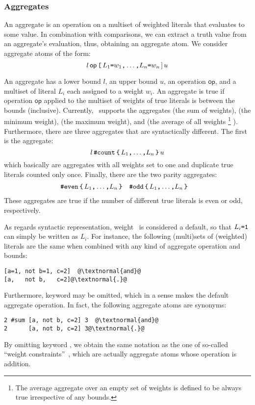 \subsubsection{Aggregates}\label{subsec:gringo:aggregate}

An aggregate is an operation on a multiset of weighted literals that evaluates to some value. 
In combination with comparisons, we can extract a truth value from an aggregate's evaluation,
thus, obtaining an aggregate atom.
We consider aggregate atoms of the form:
\[l\,\mathsf{op}\,\texttt{[}\, L_1\texttt{=}w_1\texttt{,} \dots\texttt{,} L_n\texttt{=}w_n {\,]\,} u\]

An aggregate has a lower bound $l$, an upper bound $u$, an operation $\mathsf{op}$, 
and a multiset of literal $L_i$ each assigned to a weight $w_i$.
An aggregate is true if operation $\mathsf{op}$ applied to the multiset of weights 
of true literals is between the bounds (inclusive).
Currently, \gringo\ supports the aggregates 
 (the sum of weights), 
 (the minimum weight), 
 (the maximum weight), and
 (the average of all weights
\footnote{The average aggregate over an empty set of weights is defined to be always true irrespective of any bounds.}%
).
Furthermore, there are three aggregates that are syntactically different.
The first is the  aggregate:
\[l\,\code{\#count}\,\code{\char`\{}\, L_1\code{,} \dots\code{,} L_n \,\code{\char`\}}\, u\]%
which basically are  aggregates with all weights set to one 
and duplicate true literals counted only once.
Finally, there are the two parity aggregates:
\begin{align*}
&\code{\#even}\,\code{\char`\{}\, L_1\code{,} \dots\code{,} L_n \,\code{\char`\}} & &
\code{\#odd}\,\code{\char`\{}\, L_1\code{,} \dots\code{,} L_n \,\code{\char`\}}
\end{align*}%
These aggregates are true if the number of different true literals is even or odd, respectively.

As regards syntactic representation,
weight~ is considered a default,
so that $L_i\texttt{=}\texttt{1}$ can simply be written as $L_i$.
For instance, the following (multi)sets of (weighted) literals are the same
when combined with any kind of aggregate operation and bounds:
\begin{lstlisting}[numbers=none,escapechar=@]
[a=1, not b=1, c=2]  @\textnormal{and}@
[a,   not b,   c=2]@\textnormal{.}@
\end{lstlisting}
%
Furthermore,
keyword  may be omitted, which in a sense makes  the default
aggregate operation.
In fact, the following aggregate atoms are synonyms:
\begin{lstlisting}[numbers=none,escapechar=@]
2 #sum [a, not b, c=2] 3  @\textnormal{and}@
2      [a, not b, c=2] 3@\textnormal{.}@
\end{lstlisting}
By omitting keyword , we obtain the same notation as the one of 
so-called ``weight constraints''~\cite{siniso02a,lparseManual}, which are actually aggregate atoms
whose operation is addition.

